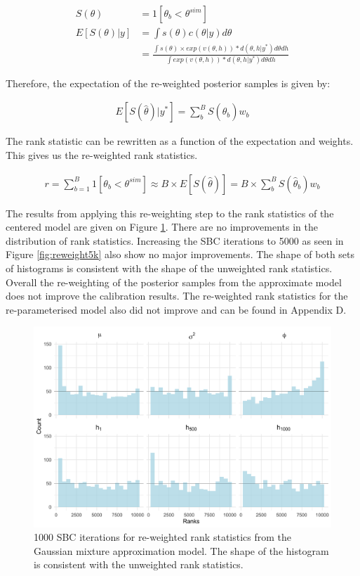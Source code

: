 \documentclass[12pt, a4paper]{article}
\begin{document}
    $$
    \begin{aligned}
    S(\theta) &= 1[\theta_b < \theta^{sim}] \\
    E[S(\theta) | y] &= \int s(\theta) c(\theta | y) d\theta\\ 
    &= \frac{\int s(\theta)\times exp(v(\theta, h)) * d(\theta, h | y^{\ast})d\theta d h}{\int exp(v(\theta, h)) * d(\theta, h | y^{\ast})d\theta d h} 
    \end{aligned}
    $$

    Therefore, the expectation of the re-weighted posterior samples is given by:

    $$
    \begin{aligned}
    E[S(\hat{\theta}) | y^{\ast}] = \sum_b^B S(\hat{\theta}_b)w_b
    \end{aligned}
    $$

    The rank statistic can be rewritten as a function of the expectation and weights. This gives us the re-weighted rank statistics.

    $$
    \begin{aligned}
    r = \sum_{b=1}^{B}1[\theta_{b} < \theta^{sim}] \approx  B\times E[S(\hat{\theta})] = B\times \sum_b^B S(\hat{\theta}_b)w_b
    \end{aligned}
    $$

    The results from applying this re-weighting step to the rank statistics of the centered model are given on Figure \ref{fig:reweight1k}. There are no improvements in the distribution of rank statistics. Increasing the SBC iterations to 5000 as seen in Figure \ref{fig:reweight5k} also show no major improvements. The shape of both sets of histograms is consistent with the shape of the unweighted rank statistics. Overall the re-weighting of the posterior samples from the approximate model does not improve the calibration results. The re-weighted rank statistics for the re-parameterised model also did not improve and can be found in Appendix D.

    \begin{figure}[H]
        \centering
        \includegraphics[scale=0.1]{results/weighted_ksc_cp_1k.png}
        \caption{1000 SBC iterations for re-weighted rank statistics from the Gaussian mixture approximation model. The shape of the histogram is consistent with the unweighted rank statistics.}
        \label{fig:reweight1k}
    \end{figure}
\end{document}
